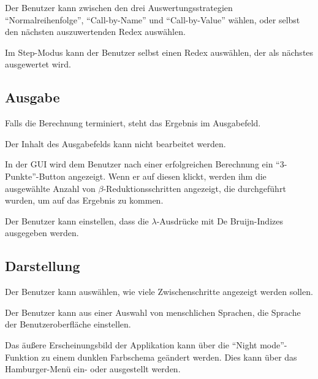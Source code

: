 \documentclass[parskip=full,11pt,twoside]{scrartcl}
\begin{document}
Der Benutzer kann zwischen den drei Auswertungsstrategien \enquote{Normalreihenfolge}, \enquote{Call-by-Name} und \enquote{Call-by-Value} wählen, oder selbst den nächsten auszuwertenden Redex auswählen.

Im Step-Modus kann der Benutzer selbst einen Redex auswählen, der als nächstes ausgewertet wird.

\subsection{Ausgabe}

Falls die Berechnung terminiert, steht das Ergebnis im Ausgabefeld.

Der Inhalt des Ausgabefelds kann nicht bearbeitet werden.

In der GUI wird dem Benutzer nach einer erfolgreichen Berechnung ein \enquote {3-Punkte}-Button angezeigt. Wenn er auf diesen klickt, werden ihm die ausgewählte Anzahl von $\beta$-Reduktionsschritten angezeigt, die durchgeführt wurden, um auf das Ergebnis zu kommen.

Der Benutzer kann einstellen, dass die $\lambda$-Ausdrücke mit De Bruijn-Indizes ausgegeben werden.


\subsection{Darstellung}

Der Benutzer kann auswählen, wie viele Zwischenschritte angezeigt werden sollen.

Der Benutzer kann aus einer Auswahl von menschlichen Sprachen, die Sprache der Benutzeroberfläche einstellen.

Das äußere Erscheinungsbild der Applikation kann über die \enquote{Night mode}-Funktion zu einem dunklen Farbschema geändert werden. Dies kann über das Hamburger-Menü ein- oder ausgestellt werden.
\end{document}
